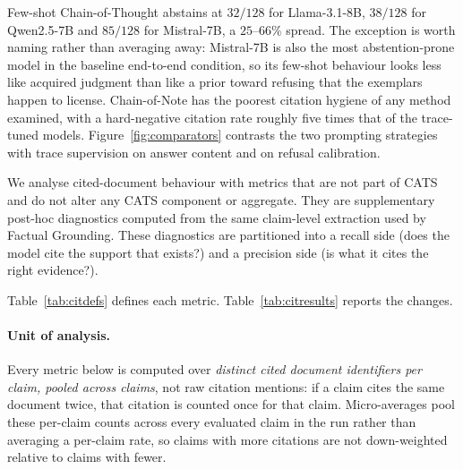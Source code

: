Few-shot Chain-of-Thought abstains at $32/128$ for Llama-3.1-8B, $38/128$ for
Qwen2.5-7B and $85/128$ for Mistral-7B, a $25$--$66\%$ spread. The exception is
worth naming rather than averaging away: Mistral-7B is also the most
abstention-prone model in the baseline end-to-end condition, so its few-shot
behaviour looks less like acquired judgment than like a prior toward refusing
that the exemplars happen to license. Chain-of-Note has the poorest citation
hygiene of any method examined, with a hard-negative citation rate roughly five
times that of the trace-tuned models. Figure~\ref{fig:comparators} contrasts the
two prompting strategies with trace supervision on answer content and on refusal
calibration.

We analyse cited-document behaviour with metrics that are not part of CATS and
do not alter any CATS component or aggregate. They are supplementary post-hoc
diagnostics computed from the same claim-level extraction used by Factual
Grounding. These diagnostics are partitioned into a recall side (does the model cite the support
that exists?) and a precision side (is what it cites the right evidence?).

Table~\ref{tab:citdefs} defines each metric. Table~\ref{tab:citresults}
reports the changes.

\paragraph{Unit of analysis.} Every metric below is computed over
\emph{distinct cited document identifiers per claim, pooled across claims},
not raw citation mentions: if a claim cites the same document twice, that
citation is counted once for that claim. Micro-averages pool these per-claim
counts across every evaluated claim in the run rather than averaging a
per-claim rate, so claims with more citations are not down-weighted relative
to claims with fewer.

